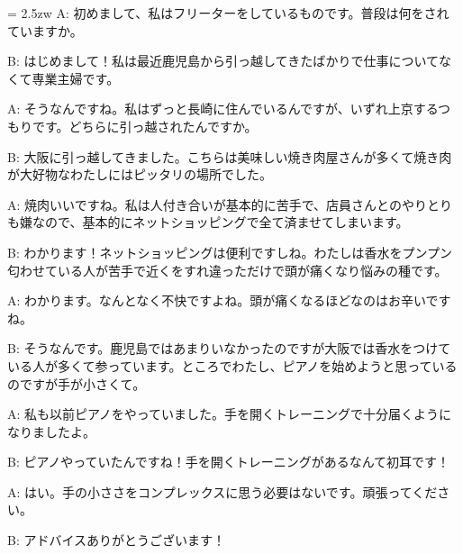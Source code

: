 \documentclass[11pt]{amsart}
\title{}
\author{}
\newenvironment{hangall}[1]{\hangindent = 2.5zw\everypar{\hangindent = 2.5zw}}{}
\begin{document}
\maketitle
\begin{hangall}{}%
A: 初めまして、私はフリーターをしているものです。普段は何をされていますか。

B: はじめまして！私は最近鹿児島から引っ越してきたばかりで仕事についてなくて専業主婦です。

A: そうなんですね。私はずっと長崎に住んでいるんですが、いずれ上京するつもりです。どちらに引っ越されたんですか。

B: 大阪に引っ越してきました。こちらは美味しい焼き肉屋さんが多くて焼き肉が大好物なわたしにはピッタリの場所でした。

A: 焼肉いいですね。私は人付き合いが基本的に苦手で、店員さんとのやりとりも嫌なので、基本的にネットショッピングで全て済ませてしまいます。

B: わかります！ネットショッピングは便利ですしね。わたしは香水をプンプン匂わせている人が苦手で近くをすれ違っただけで頭が痛くなり悩みの種です。

A: わかります。なんとなく不快ですよね。頭が痛くなるほどなのはお辛いですね。

B: そうなんです。鹿児島ではあまりいなかったのですが大阪では香水をつけている人が多くて参っています。ところでわたし、ピアノを始めようと思っているのですが手が小さくて。

A: 私も以前ピアノをやっていました。手を開くトレーニングで十分届くようになりましたよ。

B: ピアノやっていたんですね！手を開くトレーニングがあるなんて初耳です！

A: はい。手の小ささをコンプレックスに思う必要はないです。頑張ってください。

B: アドバイスありがとうございます！
\end{hangall}
\end{document}
